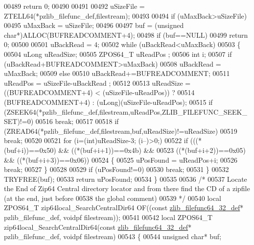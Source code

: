 \begin{DoxyCode}
00489     \textcolor{keywordflow}{return} 0;
00490 
00491 
00492   uSizeFile = ZTELL64(*pzlib\_filefunc\_def,filestream);
00493 
00494   \textcolor{keywordflow}{if} (uMaxBack>uSizeFile)
00495     uMaxBack = uSizeFile;
00496 
00497   buf = (\textcolor{keywordtype}{unsigned} \textcolor{keywordtype}{char}*)ALLOC(BUFREADCOMMENT+4);
00498   \textcolor{keywordflow}{if} (buf==NULL)
00499     \textcolor{keywordflow}{return} 0;
00500 
00501   uBackRead = 4;
00502   \textcolor{keywordflow}{while} (uBackRead<uMaxBack)
00503   \{
00504     uLong uReadSize;
00505     ZPOS64\_T uReadPos ;
00506     \textcolor{keywordtype}{int} i;
00507     \textcolor{keywordflow}{if} (uBackRead+BUFREADCOMMENT>uMaxBack)
00508       uBackRead = uMaxBack;
00509     \textcolor{keywordflow}{else}
00510       uBackRead+=BUFREADCOMMENT;
00511     uReadPos = uSizeFile-uBackRead ;
00512 
00513     uReadSize = ((BUFREADCOMMENT+4) < (uSizeFile-uReadPos)) ?
00514       (BUFREADCOMMENT+4) : (uLong)(uSizeFile-uReadPos);
00515     \textcolor{keywordflow}{if} (ZSEEK64(*pzlib\_filefunc\_def,filestream,uReadPos,ZLIB\_FILEFUNC\_SEEK\_SET)!=0)
00516       \textcolor{keywordflow}{break};
00517 
00518     \textcolor{keywordflow}{if} (ZREAD64(*pzlib\_filefunc\_def,filestream,buf,uReadSize)!=uReadSize)
00519       \textcolor{keywordflow}{break};
00520 
00521     \textcolor{keywordflow}{for} (i=(\textcolor{keywordtype}{int})uReadSize-3; (i--)>0;)
00522       \textcolor{keywordflow}{if} (((*(buf+i))==0x50) && ((*(buf+i+1))==0x4b) &&
00523         ((*(buf+i+2))==0x05) && ((*(buf+i+3))==0x06))
00524       \{
00525         uPosFound = uReadPos+i;
00526         \textcolor{keywordflow}{break};
00527       \}
00528 
00529       \textcolor{keywordflow}{if} (uPosFound!=0)
00530         \textcolor{keywordflow}{break};
00531   \}
00532   TRYFREE(buf);
00533   \textcolor{keywordflow}{return} uPosFound;
00534 \}
00535 
00536 \textcolor{comment}{/*}
00537 \textcolor{comment}{Locate the End of Zip64 Central directory locator and from there find the CD of a zipfile (at the end, just
       before}
00538 \textcolor{comment}{the global comment)}
00539 \textcolor{comment}{*/}
00540 local ZPOS64\_T zip64local\_SearchCentralDir64 OF((\textcolor{keyword}{const} \hyperlink{structzlib__filefunc64__32__def__s}{zlib\_filefunc64\_32\_def}* 
      pzlib\_filefunc\_def, voidpf filestream));
00541 
00542 local ZPOS64\_T zip64local\_SearchCentralDir64(\textcolor{keyword}{const} \hyperlink{structzlib__filefunc64__32__def__s}{zlib\_filefunc64\_32\_def}* 
      pzlib\_filefunc\_def, voidpf filestream)
00543 \{
00544   \textcolor{keywordtype}{unsigned} \textcolor{keywordtype}{char}* buf;

\end{DoxyCode}
